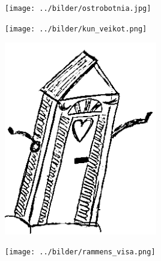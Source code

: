 %

\begin{intersong}
\sffamily\bfseries\LARGE{}
\vspace{10mm}
\begin{center}
\texttt{[image: ../bilder/ostrobotnia.jpg]} 
\end{center}
\end{intersong}

\sclearpage

\sclearpage

\begin{intersong}
	\begin{center}
		\vspace{20mm}
		\texttt{[image: ../bilder/kun\_veikot.png]} 
	\end{center}
\end{intersong}
\sclearpage

\begin{intersong}
	\begin{center}
		\includegraphics[width=0.5\textwidth]{../bilder/fardigabilder/CamillasFardigaBilder/Nylandsnationshus3.png} 
	\end{center}
\end{intersong}
\sclearpage

\begin{intersong}
	\begin{center}
		\texttt{[image: ../bilder/rammens\_visa.png]} 
	\end{center}
\end{intersong}

\sclearpage



\sclearpage

